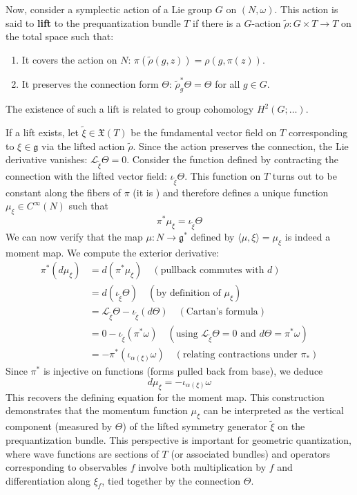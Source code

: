 Now, consider a symplectic action of a Lie group $G$ on $(N, \omega)$. This action is said to \textbf{lift} to the prequantization bundle $T$ if there is a $G$-action $\tilde{\rho}: G \times T \to T$ on the total space such that:
\begin{enumerate}
    \item It covers the action on $N$: $\pi(\tilde{\rho}(g, z)) = \rho(g, \pi(z))$.
    \item It preserves the connection form $\Theta$: $\tilde{\rho}_g^* \Theta = \Theta$ for all $g \in G$.
\end{enumerate}
The existence of such a lift is related to group cohomology $H^2(G; \dots)$.

If a lift exists, let $\tilde{\xi} \in \mathfrak{X}(T)$ be the fundamental vector field on $T$ corresponding to $\xi \in \mathfrak{g}$ via the lifted action $\tilde{\rho}$. Since the action preserves the connection, the Lie derivative vanishes: $\mathcal{L}_{\tilde{\xi}} \Theta = 0$.
Consider the function defined by contracting the connection with the lifted vector field: $\iota_{\tilde{\xi}} \Theta$. This function on $T$ turns out to be constant along the fibers of $\pi$ (it is ) and therefore defines a unique function $\mu_\xi \in C^\infty(N)$ such that 
\[ \pi^* \mu_\xi = \iota_{\tilde{\xi}} \Theta \]
We can now verify that the map $\mu: N \to \mathfrak{g}^*$ defined by $\langle \mu, \xi \rangle = \mu_\xi$ is indeed a moment map. We compute the exterior derivative:
\begin{align*} 
\pi^*(d\mu_\xi) &= d(\pi^*\mu_\xi) \quad (\text{pullback commutes with } d) \\ 
&= d(\iota_{\tilde{\xi}}\Theta) \quad (\text{by definition of } \mu_\xi) \\ 
&= \mathcal{L}_{\tilde{\xi}}\Theta - \iota_{\tilde{\xi}}(d\Theta) \quad (\text{Cartan's formula}) \\ 
&= 0 - \iota_{\tilde{\xi}}(\pi^*\omega) \quad (\text{using } \mathcal{L}_{\tilde{\xi}}\Theta = 0 \text{ and } d\Theta = \pi^*\omega) \\ 
&= -\pi^*(\iota_{\alpha(\xi)}\omega) \quad (\text{relating contractions under } \pi_*) 
\end{align*}
Since $\pi^*$ is injective on functions (forms pulled back from base), we deduce
\[ d\mu_\xi = -\iota_{\alpha(\xi)}\omega \]
This recovers the defining equation for the moment map. This construction demonstrates that the momentum function $\mu_\xi$ can be interpreted as the vertical component (measured by $\Theta$) of the lifted symmetry generator $\tilde{\xi}$ on the prequantization bundle. This perspective is important for geometric quantization, where wave functions are sections of $T$ (or associated bundles) and operators corresponding to observables $f$ involve both multiplication by $f$ and differentiation along $\xi_f$, tied together by the connection $\Theta$.